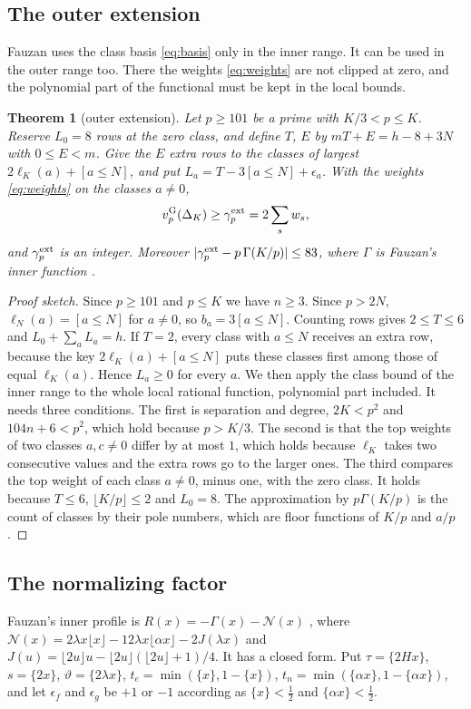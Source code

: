 \documentclass[11pt]{amsart}
\newtheorem{theorem}{Theorem}[section]
\theoremstyle{definition}
\theoremstyle{remark}
\numberwithin{equation}{section}
\newcommand{\vG}{v_p^{\mathrm G}}
\newcommand{\fr}[1]{\{#1\}}
\begin{document}
\subsection{The outer extension}
Fauzan uses the class basis \eqref{eq:basis} only in the inner range. It can be used in the outer range too. There
the weights \eqref{eq:weights} are not clipped at zero, and the polynomial part of
the functional must be kept in the local bounds.

\begin{theorem}[outer extension]\label{thm:outer}
Let $p\ge101$ be a prime with $K/3<p\le K$. Reserve $L_0=8$ rows at the zero class, and define $T$, $E$ by
$mT+E=h-8+3N$ with $0\le E<m$. Give the $E$ extra rows to the classes of largest $2\ell_K(a)+[a\le N]$, and put
$L_a=T-3[a\le N]+\epsilon_a$. With the weights \eqref{eq:weights} on the classes $a\ne0$,
\[
 \vG(\Delta_K)\ge\gamma^{\rm ext}_p=2\sum_sw_s ,
\]
and $\gamma^{\rm ext}_p$ is an integer. Moreover $|\gamma^{\rm ext}_p-p\,\Gamma(K/p)|\le83$, where $\Gamma$ is Fauzan's
inner function \cite[(5.4)]{Fauzan2026}.
\end{theorem}

\begin{proof}[Proof sketch]
Since $p\ge101$ and $p\le K$ we have $n\ge3$. Since $p>2N$, $\ell_N(a)=[a\le N]$ for $a\ne0$, so $b_a=3[a\le N]$.
Counting rows gives $2\le T\le6$ and $L_0+\sum_aL_a=h$. If $T=2$, every class with $a\le N$ receives an extra row,
because the key $2\ell_K(a)+[a\le N]$ puts these classes first among those of equal $\ell_K(a)$. Hence $L_a\ge0$ for
every $a$. We then apply the class bound of the inner range \cite[Proposition~4.1]{Fauzan2026} to the whole local
rational function, polynomial part included. It needs three conditions. The first is separation and degree,
$2K<p^2$ and $104n+6<p^2$, which hold because $p>K/3$. The second is that the top weights of two classes $a,c\ne0$
differ by at most $1$, which holds because $\ell_K$ takes two consecutive values and the extra rows go to the larger
ones. The third compares the top weight of each class $a\ne0$, minus one, with the zero class. It holds because
$T\le6$, $\lfloor K/p\rfloor\le2$ and $L_0=8$. The approximation by $p\Gamma(K/p)$ is the count of classes by their
pole numbers, which are floor functions of $K/p$ and $a/p$.
\end{proof}

\subsection{The normalizing factor}
Fauzan's inner profile is $R(x)=-\Gamma(x)-\mathcal N(x)$ \cite[(5.6)]{Fauzan2026}, where
$\mathcal N(x)=2\lambda x\lfloor x\rfloor-12\lambda x\lfloor\alpha x\rfloor-2J(\lambda x)$ and
$J(u)=\lfloor2u\rfloor u-\lfloor2u\rfloor(\lfloor2u\rfloor+1)/4$. It has a closed form. Put $\tau=\fr{2Hx}$,
$s=\fr{2x}$, $\vartheta=\fr{2\lambda x}$, $t_e=\min(\fr x,1-\fr x)$, $t_n=\min(\fr{\alpha x},1-\fr{\alpha x})$, and let
$\epsilon_f$ and $\epsilon_g$ be $+1$ or $-1$ according as $\fr x<\frac12$ and $\fr{\alpha x}<\frac12$.
\end{document}
